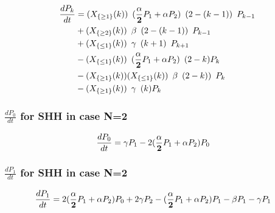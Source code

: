 \documentclass[paper=a4, fontsize=11pt, twoside, BCOR=12mm, parskip=full, listof=totoc]{scrreprt}
\begin{document}
	\begin{equation}
	\label{masterSHHTwo}
		\begin{aligned}
		{\frac{dP_k}{dt}} & =({X}_{ \{\geq 1 \}}(k))				\hspace{5pt} (\frac{\alpha}{\bf{2}} P_1+{\alpha} P_2) \hspace{5pt} (2-(k-1)) \hspace{5pt} P_{k-1} 	\\
				 & +({X}_{ \{\geq 2 \}}(k))				\hspace{5pt} \beta 	\hspace{5pt} (2-(k-1)) \hspace{5pt} P_{k-1}	\\
				 & +({X}_{\{\leq 1\}}(k)) 				\hspace{5pt} \gamma 	\hspace{5pt} (k+1) \hspace{5pt} P_{k+1}		\\
				 & -({X}_{\{\leq 1\}}(k)) 				\hspace{5pt} (\frac{\alpha}{\bf{2}} P_1+{\alpha} P_2) 	\hspace{5pt} (2-k)P_{k}			\\
				 & -({X}_{ \{\geq 1 \}}(k))	({X}_{\{\leq 1\}}(k)) 	\hspace{5pt} \beta \hspace{5pt} (2-k)) \hspace{5pt} P_{k}		\\
				 & -({X}_{ \{\geq 1 \}}(k))    			\hspace{5pt}  \gamma 	\hspace{5pt} (k)P_{k}
		\end{aligned}
	\end{equation}



\subsubsection*{$\frac{dP_0}{dt}$ for SHH in case N=2}
\begin{equation}
\label{SHH2_P_0}
	\begin{aligned}
		{\frac{dP_0}{dt}} & = \gamma P_{1} - 2 (\frac{\alpha}{\bf{2}} P_1+{\alpha} P_2) P_{0}					
	\end{aligned}
\end{equation}
\subsubsection*{$\frac{dP_1}{dt}$ for SHH in case N=2}
\begin{equation}
\label{SHH2_P_1}
	\begin{aligned}
		{\frac{dP_1}{dt}} & =2 (\frac{\alpha}{\bf{2}} P_1+{\alpha} P_2) P_{0} + 2 \gamma P_{2} - (\frac{\alpha}{\bf{2}} P_1+{\alpha} P_2) P_{1} - \beta P_{1} - \gamma P_{1}
	\end{aligned}
\end{equation}
\end{document}
